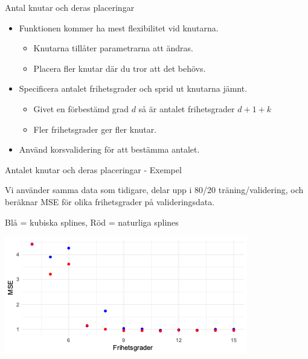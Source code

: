 \documentclass[10pt,english]{beamer}
\begin{document}
\begin{frame}{Antal knutar och deras placeringar}
    
\begin{itemize}
    \item Funktionen kommer ha mest flexibilitet vid knutarna.
    \begin{itemize}
        \item Knutarna tillåter parametrarna att ändras.
        \item Placera fler knutar där du tror att det behövs.
    \end{itemize}
    \item Specificera antalet frihetsgrader och sprid ut knutarna jämnt.
    \begin{itemize}
        \item Givet en förbestämd grad $d$ så är antalet frihetsgrader $d+1+k$
        \item Fler frihetsgrader ger fler knutar.
    \end{itemize}
    \item Använd korsvalidering för att bestämma antalet.
\end{itemize}

\end{frame}

\begin{frame}{Antalet knutar och deras placeringar - Exempel}

    Vi använder samma data som tidigare, delar upp i 80/20 träning/validering, och beräknar MSE för olika frihetsgrader på valideringsdata. 
    
    Blå = kubiska splines, Röd = naturliga splines

    \includegraphics[width=\textwidth]{figs/bsnsMSE.png}
    

\end{frame}
\end{document}
